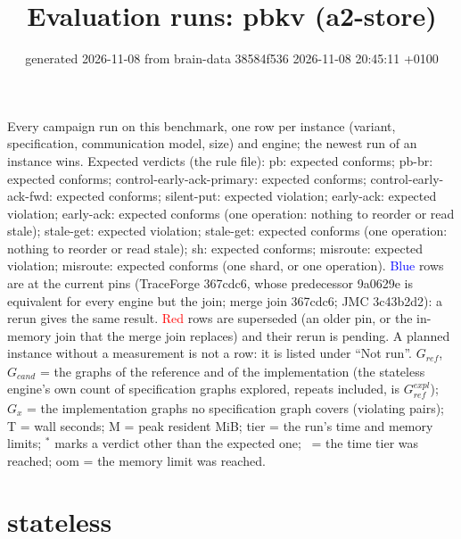 \documentclass[10pt]{article}
\title{Evaluation runs: \textsf{pbkv} (a2-store)}
\author{}
\date{generated 2026-11-08 from brain-data 38584f536 2026-11-08 20:45:11 +0100}
\begin{document}
\maketitle\small
\noindent Every campaign run on this benchmark, one row per instance (variant, specification, communication model, size) and engine; the newest run of an instance wins. Expected verdicts (the rule file): pb: expected conforms; pb-br: expected conforms; control-early-ack-primary: expected conforms; control-early-ack-fwd: expected conforms; silent-put: expected violation; early-ack: expected violation; early-ack: expected conforms (one operation: nothing to reorder or read stale); stale-get: expected violation; stale-get: expected conforms (one operation: nothing to reorder or read stale); sh: expected conforms; misroute: expected violation; misroute: expected conforms (one shard, or one operation). \textcolor{blue}{Blue} rows are at the current pins (TraceForge 367cdc6, whose predecessor 9a0629e is equivalent for every engine but the join; merge join 367cdc6; JMC 3c43b2d2): a rerun gives the same result. \textcolor{red}{Red} rows are superseded (an older pin, or the in-memory join that the merge join replaces) and their rerun is pending. A planned instance without a measurement is not a row: it is listed under ``Not run''. $G_{\mathit{ref}}$, $G_{\mathit{cand}}$ = the graphs of the reference and of the implementation (the stateless engine's own count of specification graphs explored, repeats included, is $G_{\mathit{ref}}^{\mathit{expl}}$); $G_x$ = the implementation graphs no specification graph covers (violating pairs); T = wall seconds; M = peak resident MiB; tier = the run's time and memory limits; $^{\ast}$ marks a verdict other than the expected one; \faClock\ = the time tier was reached; oom = the memory limit was reached.

\section*{stateless}
\end{document}
